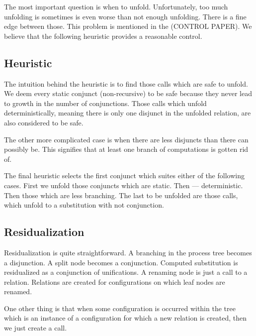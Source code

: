 The most important question is when to unfold.
Unfortunately, too much unfolding is sometimes is even worse than not enough unfolding.
There is a fine edge between those.
This problem is mentioned in the (CONTROL PAPER).
We believe that the following heuristic provides a reasonable control.

\subsection{Heuristic}

The intuition behind the heuristic is to find those calls which are safe to unfold.
We deem every static conjunct (non-recursive) to be safe because they never lead to growth in the number of conjunctions.
Those calls which unfold deterministically, meaning there is only one disjunct in the unfolded relation, are also considered to be safe.

The other more complicated case is when there are less disjuncts than there can possibly be.
This signifies that at least one branch of computations is gotten rid of.

The final heuristic selects the first conjunct which suites either of the following cases.
First we unfold those conjuncts which are static.
Then --- deterministic.
Then those which are less branching.
The last to be unfolded are those calls, which unfold to a substitution with not conjunction.

\subsection{Residualization}

Residualization is quite straightforward.
A branching in the process tree becomes a disjunction.
A split node becomes a conjunction.
Computed substitution is residualized as a conjunction of unifications.
A renaming node is just a call to a relation.
Relations are created for configurations on which leaf nodes are renamed.

One other thing is that when some configuration is occurred within the tree which is an instance of a configuration for which a new relation is created, then we just create a call.
